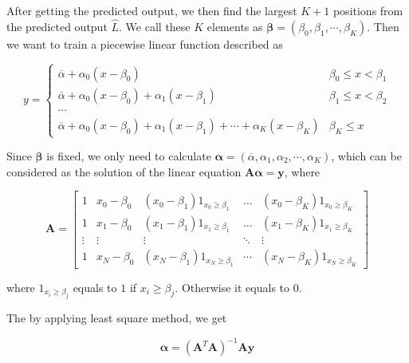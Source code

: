 After getting the predicted output, we then find the largest $K+1$ positions from the predicted output $\hat{L}$. We call these $K$ elements as $\boldsymbol{\beta}=(\beta_0, \beta_1, \cdots, \beta_K)$. Then we want to train a piecewise linear function described as 

\begin{equation}
	y=\begin{cases}
		\overline{\alpha} + \alpha_0(x-\beta_0) & \beta_0\leq x<\beta_1 \\
		\overline{\alpha} + \alpha_0(x-\beta_0) + \alpha_1(x-\beta_1) & \beta_1\leq x<\beta_2 \\
		\cdots \\
		\overline{\alpha}+ \alpha_0(x-\beta_0) + \alpha_1(x-\beta_1)+\cdots+\alpha_{K}(x-\beta_K) & \beta_K\leq x
	\end{cases}
\end{equation}

Since $\boldsymbol{\beta}$ is fixed, we only need to calculate $\boldsymbol{\alpha}=(\overline{\alpha},\alpha_1,\alpha_2,\cdots,\alpha_K)$, which can be considered as the solution of the linear equation $\boldsymbol{A}\boldsymbol{\alpha}=\boldsymbol{y}$, where

\begin{equation}
	\boldsymbol{A}=\left[\begin{array}{ccccc}
1 & x_{0}-\beta_{0} & \left(x_{0}-\beta_{1}\right) 1_{x_{0} \geq \beta_{1}} & \ldots & \left(x_{0}-\beta_{K}\right) 1_{x_{0} \geq \beta_{K}} \\
1 & x_{1}-\beta_{0} & \left(x_{1}-\beta_{1}\right) 1_{x_{1} \geq \beta_{1}} & \ldots & \left(x_{1}-\beta_{K}\right) 1_{x_{1} \geq \beta_{K}} \\
\vdots & \vdots & \vdots & \ddots & \vdots \\
1 & x_{N}-\beta_{0} & \left(x_{N}-\beta_{1}\right) 1_{x_{N} \geq \beta_{1}} & \cdots & \left(x_{N}-\beta_{K}\right) 1_{x_{N} \geq \beta_{K}}
\end{array}\right]
\end{equation}

where $1_{x_i\geq \beta_j}$ equals to $1$ if $x_i\geq \beta_j$. Otherwise it equals to $0$.

The by applying least square method, we get 

\begin{equation}
	\boldsymbol{\alpha}=(\boldsymbol{A}^T\boldsymbol{A})^{-1}\boldsymbol{A}\boldsymbol{y}
\end{equation}

